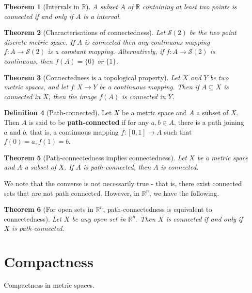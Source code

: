 \documentclass[10pt, oneside, reqno]{amsart}
\theoremstyle{plain}%
\newtheorem{thm}{Theorem}[section]
\theoremstyle{definition}
\newtheorem{defn}[thm]{Definition}
\theoremstyle{remark}
\newcommand{\R}{\mathbb{R}}
\begin{document}
\begin{thm}[Intervals in $\R$]
	A subset $A$ of $\R$ containing at least two points is connected if and only if $A$ is a interval.
\end{thm}

\begin{thm}[Characterisations of connectedness]
	Let $\mathcal{S}(2)$ be the two point discrete metric space.
	If $A$ is connected then any continuous mapping $f: A \rightarrow \mathcal{S}(2)$ is a constant mapping.  Alternatively, if $f : A \rightarrow \mathcal{S}(2)$ is continuous, then $f(A) = \{0\}$ or $\{1\}$.
\end{thm}

\begin{thm}[Connectedness is a topological property]
	Let $X$ and $Y$ be two metric spaces, and let $f: X \rightarrow Y$ be a continuous mapping.  Then if $A \subseteq X$ is connected in $X$, then the image $f(A)$ is connected in $Y$.
\end{thm}


\begin{defn}[Path-connected]
	Let $X$ be a metric space and $A$ a subset of $X$. Then $A$ is said to be \textbf{path-connected} if for any $a,b \in A$, there is a path joining $a$ and $b$, that is, a continuous mapping $f: [0,1] \rightarrow A$ such that $f(0) = a, f(1) = b$.
\end{defn}



\begin{thm}[Path-connectedness implies connectedness]
	Let $X$ be a metric space and $A$ a subset of $X$.  If $A$ is path-connected, then $A$ is connected. 
\end{thm}
We note that the converse is not necessarily true - that is, there exist connected sets that are not path connected.  However, in $\R^n$, we have the following.

\begin{thm}[For open sets in $\R^n$, path-connectedness is equivalent to connectedness]
	Let $X$ be any open set in $\R^n$.  Then $X$ is connected if and only if $X$ is path-connected.
\end{thm}




\section{Compactness} %
\label{sec:compactness}
Compactness in metric spaces.
\end{document}
